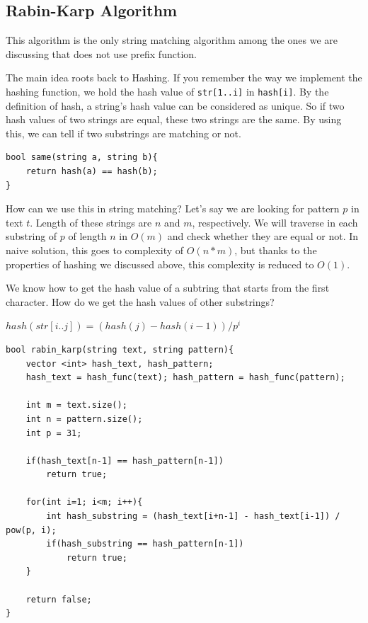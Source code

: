 \documentclass[12pt]{article}
\begin{document}
        \subsection{Rabin-Karp Algorithm}
        This algorithm is the only string matching algorithm among the ones we are discussing that does not use prefix function.
        
        The main idea roots back to Hashing. If you remember the way we implement the hashing function, we hold the hash value of \texttt{str[1..i]} in \texttt{hash[i]}. By the definition of hash, a string's hash value can be considered as unique. So if two hash values of two strings are equal, these two strings are the same. By using this, we can tell if two substrings are matching or not.
        
        \begin{verbatim}
bool same(string a, string b){
    return hash(a) == hash(b);
}
        \end{verbatim}
        
        How can we use this in string matching? Let's say we are looking for pattern $p$ in text $t$. Length of these strings are $n$ and $m$, respectively. We will traverse in each substring of $p$ of length $n$ in $O(m)$ and check whether they are equal or not. In naive solution, this goes to complexity of $O(n*m)$, but thanks to the properties of hashing we discussed above, this complexity is reduced to $O(1)$.
        
        \newpage
        
        We know how to get the hash value of a subtring that starts from the first character. How do we get the hash values of other substrings?
        
        $hash(str[i..j]) = (hash(j) - hash(i-1)) / p^i$
        
        \begin{verbatim}
bool rabin_karp(string text, string pattern){
	vector <int> hash_text, hash_pattern;
	hash_text = hash_func(text); hash_pattern = hash_func(pattern);

	int m = text.size();
	int n = pattern.size();
	int p = 31;

	if(hash_text[n-1] == hash_pattern[n-1])
		return true;

	for(int i=1; i<m; i++){
		int hash_substring = (hash_text[i+n-1] - hash_text[i-1]) / pow(p, i);
		if(hash_substring == hash_pattern[n-1])
			return true;
	}

	return false;
}
    \end{verbatim}
        
\end{document}
